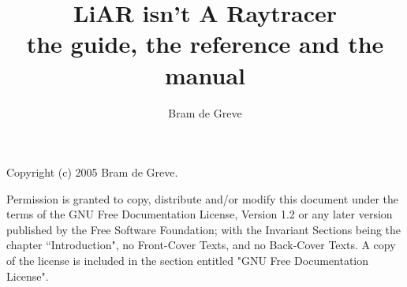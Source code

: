 \documentclass[10pt,a4paper,titlepage,english]{report}
\title{LiAR isn't A Raytracer\\ \small{the guide, the reference and the manual}}
\author{Bram de Greve}
\begin{document}
\maketitle

\setlength\parskip{\medskipamount}
\setlength\parindent{0pt}

\pagestyle{plain}
\setcounter{page}{1}

Copyright (c)  2005  Bram de Greve.

Permission is granted to copy, distribute and/or modify this document under the terms of the GNU Free Documentation License, Version 1.2 or any later version published by the Free Software Foundation; with the Invariant Sections being the chapter ``Introduction", no Front-Cover Texts, and no Back-Cover Texts.  A copy of the license is included in the section entitled "GNU Free Documentation License".

\setlength\parskip{0pt}
\tableofcontents
\setlength\parskip{\medskipamount}

\clearpage
\pagestyle{fancy}
\setcounter{page}{1}













\appendix




\end{document}
